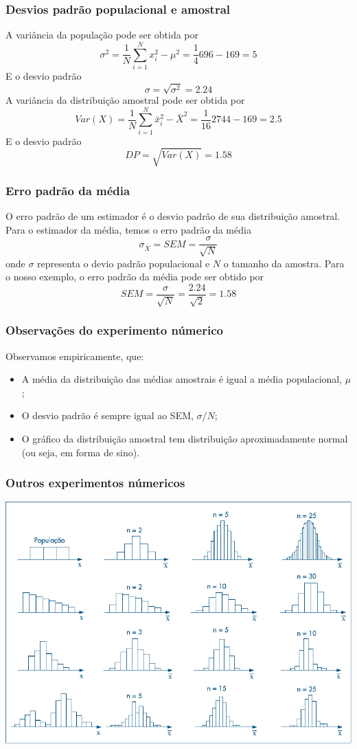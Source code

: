 \documentclass[11pt]{beamer}
\begin{document}
\begin{frame}
\frametitle{Desvios padrão populacional e amostral}
A variância da população pode ser obtida por
\[\sigma^2 = \frac{1}{N}\sum_{i=1}^N x_i^2 - \mu^2=\frac{1}{4}696-169=5\]
E o desvio padrão
\[\sigma= \sqrt{\sigma^2} = 2.24\]
A variância da distribuição amostral pode ser obtida por
\[Var(X) = \frac{1}{N}\sum_{i=1}^N \bar{x}_i^2 - \bar{X}^2=\frac{1}{16}2744-169=2.5\]
E o desvio padrão
\[DP = \sqrt{Var(X)} = 1.58\]
\end{frame}

\begin{frame}
\frametitle{Erro padrão da média}
O erro padrão de um estimador é o desvio padrão de sua distribuição amostral. Para o estimador da média, temos o erro padrão da média
\[\sigma_{\bar{X}} = SEM = \frac{\sigma}{\sqrt{N}}\]
onde \(\sigma\) representa o devio padrão populacional e \(N\) o tamanho da amostra.
Para o nosso exemplo, o erro padrão da média pode ser obtido por
\[SEM = \frac{\sigma}{\sqrt{N}} = \frac{2.24}{\sqrt{2}}=1.58\]

\end{frame}

\begin{frame}
\frametitle{Observações do experimento númerico}
Observamos empiricamente, que:
\begin{itemize}
\item A média da distribuição das médias amostrais é igual a média populacional, \(\mu\);
\item O desvio padrão é sempre igual ao SEM, \(\sigma/N\);
\item O gráfico da distribuição amostral tem distribuição aproximadamente normal (ou seja, em forma de sino).
\end{itemize}

\end{frame}


\begin{frame}
\frametitle{Outros experimentos númericos}
\begin{center}\includegraphics[width=0.9\linewidth]{figs/func2}\end{center}
\end{frame}
\end{document}

